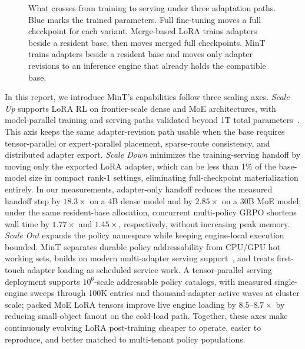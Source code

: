 \documentclass{llmxive}
\begin{document}
\begin{figure}[!htbp]
{
}
    \caption{What crosses from training to serving under three adaptation paths. Blue marks the trained parameters. Full fine-tuning moves a full checkpoint for each variant. Merge-based LoRA trains adapters beside a resident base, then moves merged full checkpoints. MinT trains adapters beside a resident base and moves only adapter revisions to an inference engine that already holds the compatible base.}
    \label{fig:mint_handoff_paths}
\end{figure}

In this report, we introduce MinT's capabilities follow three scaling axes. \textit{Scale Up} supports LoRA RL on frontier-scale dense and MoE architectures, with model-parallel training and serving paths validated beyond 1T total parameters~\citep{qwen3_2025,deepseekv4_2026,glm5_2026,kimi_k2_2025}. This axis keeps the same adapter-revision path usable when the base requires tensor-parallel or expert-parallel placement, sparse-route consistency, and distributed adapter export. \textit{Scale Down} minimizes the training-serving handoff by moving only the exported LoRA adapter, which can be less than 1\% of the base-model size in compact rank-1 settings, eliminating full-checkpoint materialization entirely. In our measurements, adapter-only handoff reduces the measured handoff step by $18.3\times$ on a 4B dense model and by $2.85\times$ on a 30B MoE model; under the same resident-base allocation, concurrent multi-policy GRPO shortens wall time by $1.77\times$ and $1.45\times$, respectively, without increasing peak memory. \textit{Scale Out} expands the policy namespace while keeping engine-local execution bounded. MinT separates durable policy addressability from CPU/GPU hot working sets, builds on modern multi-adapter serving support~\citep{vllm2023,punica2024,slora2023,dlora2024,loraserve2025}, and treats first-touch adapter loading as scheduled service work. A tensor-parallel serving deployment supports $10^6$-scale addressable policy catalogs, with measured single-engine sweeps through 100K entries and thousand-adapter active waves at cluster scale; packed MoE LoRA tensors improve live engine loading by $8.5$--$8.7\times$ by reducing small-object fanout on the cold-load path. Together, these axes make continuously evolving LoRA post-training cheaper to operate, easier to reproduce, and better matched to multi-tenant policy populations.
\end{document}
